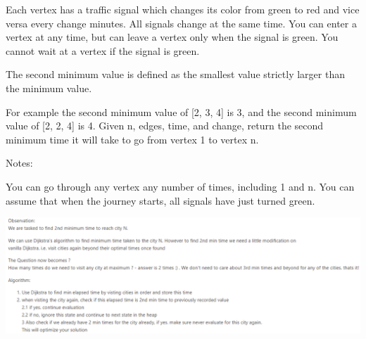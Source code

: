 \documentclass[9pt, b5paaper]{book}
\begin{document}
Each vertex has a traffic signal which changes its color from green to red and vice versa every change minutes. All signals change at the same time. You can enter a vertex at any time, but can leave a vertex only when the signal is green. You cannot wait at a vertex if the signal is green.

The second minimum value is defined as the smallest value strictly larger than the minimum value.

For example the second minimum value of [2, 3, 4] is 3, and the second minimum value of [2, 2, 4] is 4.
Given n, edges, time, and change, return the second minimum time it will take to go from vertex 1 to vertex n.

Notes:

You can go through any vertex any number of times, including 1 and n.
You can assume that when the journey starts, all signals have just turned green.

\includegraphics[width=.9\linewidth]{./pic/redGreen.png}
\end{document}
